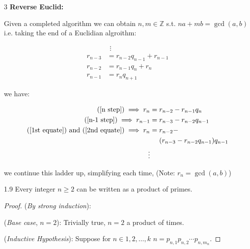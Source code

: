 \documentclass[8pt]{extarticle}
\begin{document}
\begin{multicols}{3}
        \textbf{Reverse Euclid:}

        Given a completed algorithm we can obtain \(n,m\in\mathbb{Z}\) s.t. \(na+mb=\gcd(a,b)\) i.e. taking the end of a Euclidian algroithm:

        \vspace{-15pt}
        \begin{align}
            &\hspace{5pt}\vdots\\
            r_{n-3}&=r_{n-2}q_{n-1}+r_{n-1} \label{n-1 step}\\
            r_{n-2}&=r_{n-1}q_{n}+r_{n} \label{n step}\\
            r_{n-1}&=r_{n}q_{n+1}\nonumber
        \end{align}
        \vspace{-15pt}

        we have:

        \vspace{-15pt}
        \begin{align}
            \text{(\ref{n step})}\implies r_{n}&=r_{n-2}-r_{n-1}q_{n} \label{1st equate}\\
            \text{(\ref{n-1 step})}\implies r_{n-1}&=r_{n-3}-r_{n-2}q_{n-1} \label{2nd equate}\\
            \text{(\ref{1st equate}) and (\ref{2nd equate})}\implies r_{n}&=\begin{aligned}[t]&r_{n-2}-\\&(r_{n-3}-r_{n-2}q_{n-1})q_{n-1}\end{aligned} \nonumber\\
            \vdots\nonumber
        \end{align}
        \vspace{-15pt}

        we continue this ladder up, simplifying each time,
        {\footnotesize (Note: \(r_{n}=\gcd(a,b)\))}

        \begin{theorem}{1.9}
            Every integer \(n\ge2\) can be written as a product of primes.
        \end{theorem}

        \begin{proof}
            (\textit{By strong induction}):

            (\textit{Base case}, \(n=2\)): Trivially true, \(n=2\) a product of times.

            (\textit{Inductive Hypothesis}): Suppose for \(n\in{1,2,\ldots,k}\) \(n=p_{n,1}p_{n,2}\cdots p_{n,m_n}\).
            

\end{proof}
\end{multicols}
\end{document}
